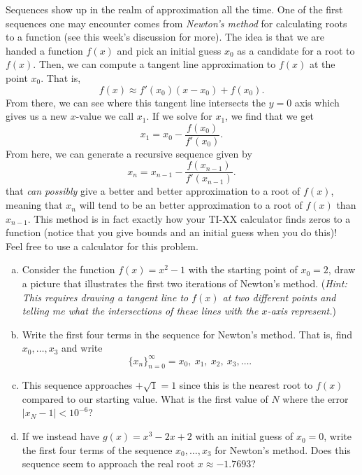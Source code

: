 \documentclass[12pt]{amsbook}
\begin{document}
\begin{problem}
Sequences show up in the realm of approximation all the time.  One of the first sequences one may encounter comes from \emph{Newton's method} for calculating roots to a function (see this week's discussion for more).  The idea is that we are handed a function $f(x)$ and pick an initial guess $x_0$ as a candidate for a root to $f(x)$. Then, we can compute a tangent line approximation to $f(x)$ at the point $x_0$. That is,
\[
f(x)\approx f'(x_0)(x-x_0)+f(x_0).
\]
From there, we can see where this tangent line intersects the $y=0$ axis which gives us a new $x$-value we call $x_1$.  If we solve for $x_1$, we find that we get
\[
x_1 = x_0 -\frac{f(x_0)}{f'(x_0)}.
\]
From here, we can generate a recursive sequence given by
\[
x_{n}=x_{n-1}-\frac{f(x_{n-1})}{f'(x_{n-1})}.
\]
that \emph{can possibly} give a better and better approximation to a root of $f(x)$, meaning that $x_n$ will tend to be an better approximation to a root of $f(x)$ than $x_{n-1}$. This method is in fact exactly how your TI-XX calculator finds zeros to a function (notice that you give bounds and an initial guess when you do this)!\\

\noindent Feel free to use a calculator for this problem.
\begin{enumerate}[(a)]
    \item Consider the function $f(x)=x^2-1$ with the starting point of $x_0=2$, draw a picture that illustrates the first two iterations of Newton's method. (\emph{Hint: This requires drawing a tangent line to $f(x)$ at two different points and telling me what the intersections of these lines with the $x$-axis represent.})
    \item Write the first four terms in the sequence for Newton's method. That is, find $x_0,\dots,x_3$ and write
    \[
    \{x_n\}_{n=0}^\infty = x_0,~x_1,~x_2,~x_3,\dots.
    \]
    \item This sequence approaches $+\sqrt{1}=1$ since this is the nearest root to $f(x)$ compared to our starting value. What is the first value of $N$ where the error $|x_N-1|<10^{-6}$?
    \item If we instead have $g(x)=x^3-2x+2$ with an initial guess of $x_0=0$, write the first four terms of the sequence $x_0,\dots,x_3$ for Newton's method. Does this sequence seem to approach the real root $x\approx -1.7693$?
\end{enumerate}
\end{problem}
%
\end{document}
